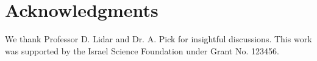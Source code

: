 \documentclass[reprint, amsmath,amssymb,nofootinbib, aps,superscriptaddress,longbibliography]{revtex4-1}
\begin{document}
\section*{Acknowledgments}
We thank Professor D. Lidar and Dr. A. Pick for insightful discussions. This work was supported by the Israel Science Foundation under Grant No. 123456.



\end{document}
